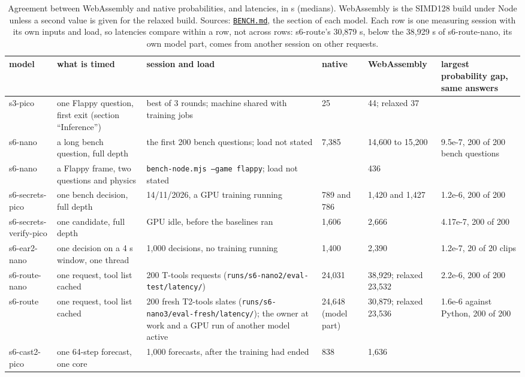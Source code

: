 \documentclass[10pt]{article}
\begin{document}
\begin{table}[tbp]
\centering
\footnotesize
\setlength{\tabcolsep}{3pt}
\caption[Agreement between WebAssembly and native probabilities, and latencies.]{Agreement between WebAssembly and native probabilities, and latencies, in \textmu{}s (medians). WebAssembly is the SIMD128 build under Node unless a second value is given for the relaxed build. Sources: \href{https://github.com/maxgfr/skycmd/blob/main/BENCH.md}{\texttt{BENCH.md}}, the section of each model. Each row is one measuring session with its own inputs and load, so latencies compare within a row, not across rows: s6-route's 30,879 \textmu{}s, below the 38,929 \textmu{}s of s6-route-nano, its own model part, comes from another session on other requests.}\label{tab:2}
\begin{tabularx}{\linewidth}{@{}P{2.3cm}P{2.3cm}LR{1.35cm}R{1.85cm}P{2.2cm}@{}}
\toprule
model & what is timed & session and load & native & WebAssembly & largest probability gap, same answers \\
\midrule
s3-pico & one Flappy question, first exit (section ``Inference'') & best of 3 rounds; machine shared with training jobs & 25 & 44; relaxed 37 & \\
s6-nano & a long bench question, full depth & the first 200 bench questions; load not stated & 7,385 & 14,600 to 15,200 & 9.5e-7, 200 of 200 bench questions \\
s6-nano & a Flappy frame, two questions and physics & \texttt{bench-\allowbreak{}node.mjs --game flappy}; load not stated & & 436 & \\
s6-secrets-pico & one bench decision, full depth & 14/11/2026, a GPU training running & 789 and 786 & 1,420 and 1,427 & 1.2e-6, 200 of 200 \\
s6-secrets-verify-pico & one candidate, full depth & GPU idle, before the baselines ran & 1,606 & 2,666 & 4.17e-7, 200 of 200 \\
s6-ear2-nano & one decision on a 4 s window, one thread & 1,000 decisions, no training running & 1,400 & 2,390 & 1.2e-7, 20 of 20 clips \\
s6-route-nano & one request, tool list cached & 200 T-tools requests (\texttt{runs/\allowbreak{}s6-nano2/\allowbreak{}eval-test/\allowbreak{}latency/\allowbreak{}}) & 24,031 & 38,929; relaxed 23,532 & 2.2e-6, 200 of 200 \\
s6-route & one request, tool list cached & 200 fresh T2-tools slates (\texttt{runs/\allowbreak{}s6-nano3/\allowbreak{}eval-fresh/\allowbreak{}latency/\allowbreak{}}); the owner at work and a GPU run of another model active & 24,648 (model part) & 30,879; relaxed 23,536 & 1.6e-6 against Python, 200 of 200 \\
s6-cast2-pico & one 64-step forecast, one core & 1,000 forecasts, after the training had ended & 838 & 1,636 & \\
\bottomrule
\end{tabularx}
\end{table}
\end{document}
